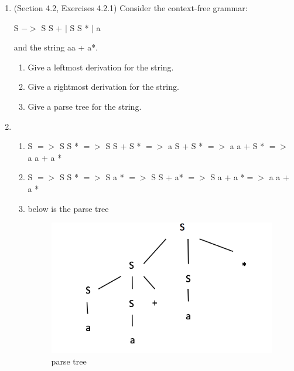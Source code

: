 \documentclass[12pt,a4paper]{article}
\makeatletter
\newtheorem*{solution}{Solution}
\renewenvironment{solution}[1][Solution] {\par\pushQED{\qed}\normalfont\topsep6\p@\@plus6\p@\relax\trivlist\item[\hskip\labelsep\bfseries#1\@addpunct{.}]\ignorespaces}{\popQED\endtrivlist\@endpefalse} \makeatother
\makeatother
\begin{document}
\begin{enumerate}
\item (Section 4.2, Exercises 4.2.1) Consider the context-free grammar:

    \begin{center}
    S $->$ S S + $|$ S S * $|$ a
    \end{center}
    
    and the string aa + a*.

    \begin{enumerate}
    \item Give a leftmost derivation for the string.
    \item Give a rightmost derivation for the string.
    \item Give a parse tree for the string.
    \end{enumerate}

\begin{solution}

    \textrm{\\}
    \begin{enumerate}
    \item S $=>$ S S * $=>$ S S + S * $=>$ a S + S * $=>$ a a + S * $=>$ a a + a *
    \item S $=>$ S S * $=>$ S a * $=>$ S S + a* $=>$ S a + a *$=>$ a a + a *
    \item below is the parse tree

    \begin{figure}[h]
    \center
    \includegraphics[width=0.8\linewidth]{sol}\vspace{-10pt}
    \caption{parse tree} \label{parse tree}\vspace{-10pt}
    \end{figure}
    \end{enumerate}

\end{solution}


\end{enumerate}
\end{document}
